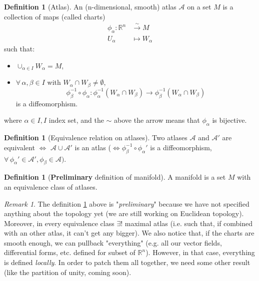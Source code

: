 \documentclass[a4paper,11pt,titlepage, article, oneside]{memoir}
\numberwithin{equation}{section}
\theoremstyle{definition}
\newtheorem{definition}[theorem]{Definition}
\theoremstyle{remark}
\newtheorem{remark}[theorem]{Remark}
\newcommand{\rfield}{\mathbb{R}}
\begin{document}
\begin{definition}[Atlas] \label{atlasdef}
  An (n-dimensional, smooth) atlas $\mathcal{A}$ on a set $M$ is a collection of maps (called charts)
  \begin{align}
    \phi_{\alpha} \colon \rfield^n &\overset{\sim}{\rightarrow} M \\
    U_{\alpha} &\mapsto W_{\alpha} \nonumber
  \end{align}
  such that:
  \begin{itemize}
    \item $\cup_{\alpha \in I} W_{\alpha} = M$,
    \item $\forall\, \alpha, \beta \in I$ with $W_{\alpha} \cap W_{\beta} \not = \emptyset$,
    $$\phi^{-1}_{\beta} \circ \phi_{\alpha} \colon \phi^{-1}_{\alpha}(W_{\alpha} \cap W_{\beta}) \rightarrow \phi_{\beta}^{-1}(W_{\alpha} \cap W_{\beta})$$
    is a diffeomorphism.
  \end{itemize}
  where $\alpha \in I, I$ index set, and the $\sim$ above the arrow means that $\phi_{\alpha}$ is bijective.
\end{definition}

\begin{definition} [Equivalence relation on atlases]
  Two atlases $\mathcal{A}$ and $\mathcal{A'}$ are equivalent $\Leftrightarrow$ $\mathcal{A} \cup \mathcal{A'}$ is an atlas ($\Leftrightarrow \phi_{\beta}^{-1} \circ \phi_{\alpha}'$ is a diffeomorphism, $\forall\, \phi_{\alpha}' \in \mathcal{A}', \phi_{\beta} \in \mathcal{A})$.
\end{definition}

\begin{definition}[\textbf{Preliminary} definition of manifold] \label{manifoldprel}
  A manifold is a set $M$ with an equivalence class of atlases.
\end{definition}

\begin{remarkbox}\begin{remark}
  The definition \ref{manifoldprel} above is "\textit{preliminary}" because we have not specified anything about the topology yet (we are still working on Euclidean topology). Moreover, in every equivalence class $\exists!$ maximal atlas (i.e. such that, if combined with an other atlas, it can't get any bigger). We also notice that, if the charts are smooth enough, we can pullback "everything" (e.g. all our vector fields, differential forms, etc. defined for subset of $\rfield^n$). However, in that case, everything is defined \textit{locally}. In order to patch them all together, we need some other result (like the partition of unity, coming soon).
\end{remark}\end{remarkbox}
\end{document}
